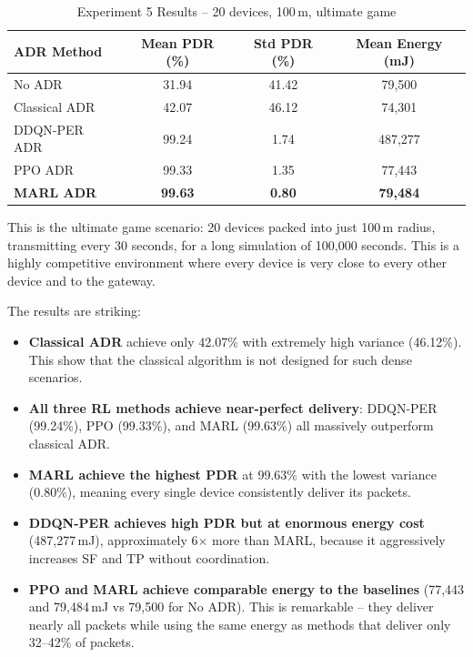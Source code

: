 \documentclass[12pt,a4paper]{article}
\begin{document}
\begin{table}[H]
\centering
\caption{Experiment 5 Results -- 20 devices, 100\,m, ultimate game}
\label{tab:exp5}
\begin{tabular}{@{}lccc@{}}
\toprule
\textbf{ADR Method} & \textbf{Mean PDR (\%)} & \textbf{Std PDR (\%)} & \textbf{Mean Energy (mJ)} \\
\midrule
No ADR          & 31.94 & 41.42 & 79,500 \\
Classical ADR   & 42.07 & 46.12 & 74,301 \\
DDQN-PER ADR    & 99.24 & 1.74  & 487,277 \\
PPO ADR         & 99.33 & 1.35  & 77,443 \\
\textbf{MARL ADR} & \textbf{99.63} & \textbf{0.80} & \textbf{79,484} \\
\bottomrule
\end{tabular}
\end{table}

This is the ultimate game scenario: 20 devices packed into just 100\,m radius, transmitting every 30 seconds, for a long simulation of 100,000 seconds. This is a highly competitive environment where every device is very close to every other device and to the gateway.

The results are striking:
\begin{itemize}
    \item \textbf{Classical ADR} achieve only 42.07\% with extremely high variance (46.12\%). This show that the classical algorithm is not designed for such dense scenarios.
    \item \textbf{All three RL methods achieve near-perfect delivery}: DDQN-PER (99.24\%), PPO (99.33\%), and MARL (99.63\%) all massively outperform classical ADR.
    \item \textbf{MARL achieve the highest PDR} at 99.63\% with the lowest variance (0.80\%), meaning every single device consistently deliver its packets.
    \item \textbf{DDQN-PER achieves high PDR but at enormous energy cost} (487,277\,mJ), approximately 6$\times$ more than MARL, because it aggressively increases SF and TP without coordination.
    \item \textbf{PPO and MARL achieve comparable energy to the baselines} (77,443 and 79,484\,mJ vs 79,500 for No ADR). This is remarkable -- they deliver nearly all packets while using the same energy as methods that deliver only 32--42\% of packets.
\end{itemize}
\end{document}
